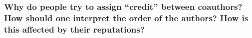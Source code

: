 \documentclass[12pt]{beamer}
\begin{document}
\begin{frame}





%
%


\end{frame} \begin{frame}
  \frametitle{Why do people try to assign ``credit'' between coauthors? How should one interpret the order of the authors? How is this affected by their reputations?}






\end{frame}
\end{document}
